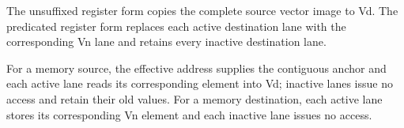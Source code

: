 The unsuffixed register form copies the complete source vector image to Vd.
The predicated register form replaces each active destination lane with the
corresponding Vn lane and retains every inactive destination lane.

For a memory source, the effective address supplies the contiguous anchor and
each active lane reads its corresponding element into Vd; inactive lanes issue
no access and retain their old values. For a memory destination, each active
lane stores its corresponding Vn element and each inactive lane issues no
access.
